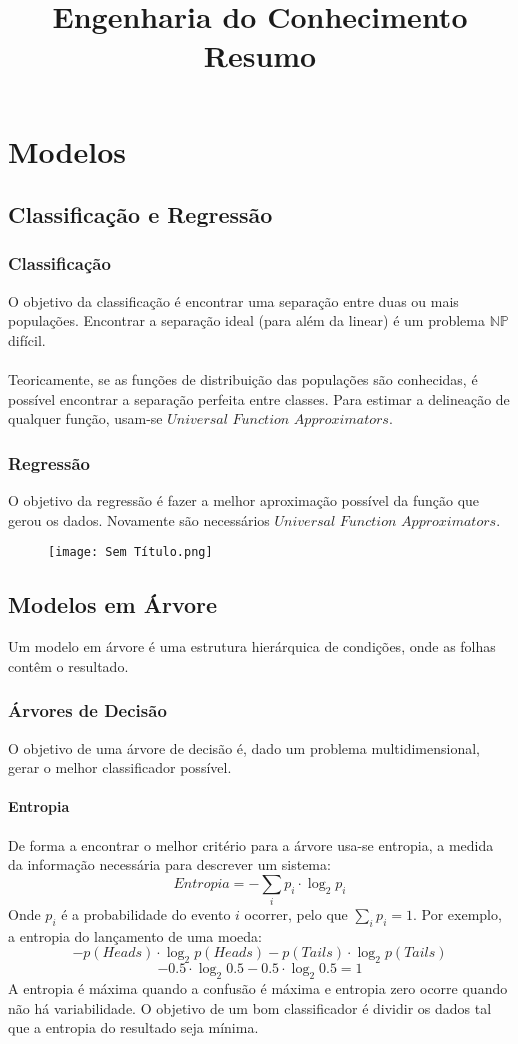 \documentclass[10pt,a4paper]{report}
\title{\LARGE{Engenharia do Conhecimento} \\ \vspace{0.5cm} \normalsize{Resumo}}
\date{}
\begin{document}
\maketitle
\tableofcontents

\chapter{Modelos}
\section{Classificação e Regressão}
\subsection{Classificação}
O objetivo da classificação é encontrar uma separação entre duas ou mais populações. Encontrar a separação ideal (para além da linear) é um problema $\mathbb{N}\mathbb{P}$ difícil.\\
\\
Teoricamente, se as funções de distribuição das populações são conhecidas, é possível encontrar a separação perfeita entre classes. Para estimar a delineação de qualquer função, usam-se $Universal$ $Function$ $Approximators$.
\subsection{Regressão}
O objetivo da regressão é fazer a melhor aproximação possível da função que gerou os dados. Novamente são necessários $Universal$ $Function$ $Approximators$.
\begin{figure}[H]
\centering
\texttt{[image: Sem Título.png]}
\end{figure}
\section{Modelos em Árvore}
Um modelo em árvore é uma estrutura hierárquica de condições, onde as folhas contêm o resultado.
\subsection{Árvores de Decisão}
O objetivo de uma árvore de decisão é, dado um problema multidimensional, gerar o melhor classificador possível. 
\subsubsection{Entropia}
De forma a encontrar o melhor critério para a árvore usa-se entropia, a medida da informação necessária para descrever um sistema:
$$
Entropia = -\sum_{i} p_i \cdot \log_2 p_i
$$
Onde $p_i$ é a probabilidade do evento $i$ ocorrer, pelo que $\sum_i p_i = 1$. Por exemplo, a entropia do lançamento de uma moeda:
$$
-p(Heads) \cdot \log_2 p(Heads) - p(Tails) \cdot \log_2 p(Tails)
$$
$$
-0.5 \cdot \log_2 0.5 -0.5 \cdot \log_2 0.5 = 1
$$
A entropia é máxima quando a confusão é máxima e entropia zero ocorre quando não há variabilidade. O objetivo de um bom classificador é dividir os dados tal que a entropia do resultado seja mínima.
\end{document}
